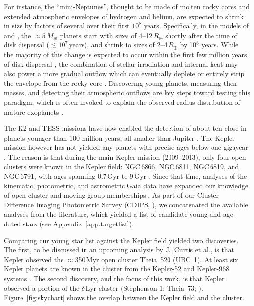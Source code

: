 \documentclass[12pt,modern,twocolumn,tighten]{aastex63}
\begin{document}
For instance, the ``mini-Neptunes'', thought to be made of molten
rocky cores \citep{kite_atmosphere_2020} and extended atmospheric
envelopes of hydrogen and helium, are expected to shrink in size by
factors of several over their first $10^8$ years.  Specifically, in
the models of \citet{owen_atmospheres_2016} and
\citet{owen_constraining_2020}, the $\approx5\,M_\oplus$ planets start
with sizes of 4--12\,$R_\oplus$ shortly after the time of disk
dispersal ($\lesssim$$10^7$\,years), and shrink to sizes of
2--4\,$R_\oplus$ by 10$^8$ years.  While the majority of this change
is expected to occur within the first few million years of disk
dispersal \citep{owen_atmospheres_2016}, the combination of stellar
irradiation and internal heat may also power a more gradual outflow
which can eventually deplete or entirely strip the envelope from the
rocky core \citep{Owen_Wu_2013,ginzburg_corepowered_2018}.
Discovering young planets, measuring their masses, and detecting their
atmospheric outflows are key steps toward testing this paradigm, which
is often invoked to explain the observed radius distribution of mature
exoplanets \citep{Fulton_et_al_2017}.

The K2 and TESS missions have now enabled the detection of about ten
close-in planets younger than 100 million years, all smaller than
Jupiter
\citep{Mann_K2_33b_2016,David_et_al_2017,david_four_2019,newton_tess_2019,bouma_cluster_2020,plavchan_planet_2020,rizzuto_tess_2020}.
The Kepler mission however has not yielded any planets with precise
ages below one gigayear \citep{Meibom_et_al_2013}.  The reason is that
during the main Kepler mission (2009--2013), only four open
clusters were known in the Kepler field: NGC\,6866, NGC\,6811,
NGC\,6819, and NGC\,6791, with ages spanning 0.7\,Gyr to 9\,Gyr
\citep{meibom_kepler_2011}.  Since that time, analyses of the
kinematic, photometric, and astrometric Gaia data have expanded our
knowledge of open cluster and moving group memberships \citep[{\it
e.g.},][]{cantatgaudin_gaia_2018,zari_3d_2018,kounkel_untangling_2019,Meingast2021,Kerr2021}.
As part of our Cluster Difference Imaging Photometric Survey (CDIPS,
\citealt{bouma_cdipsI_2019}), we concatenated the available analyses
from the literature, which yielded a list of candidate young and
age-dated stars (see Appendix~\ref{app:targetlist}).

Comparing our young star list against the Kepler field yielded two
discoveries.  The first, to be discussed in an upcoming analysis by
J.~Curtis et al{.}, is that Kepler observed the $\approx$350\,Myr open
cluster Theia~520 (UBC~1).  At least six Kepler planets are known in
the cluster from the Kepler-52 and Kepler-968 systems
\citep{rowe_validation_2014,jontof-hutter_following_2021}.  The second
discovery, and the focus of this work, is that Kepler observed a
portion of the $\delta$\,Lyr cluster (Stephenson-1; Theia~73;
\citealt{stephenson_possible_1959}).  Figure~\ref{fig:skychart} shows
the overlap between the Kepler field and the cluster.
\end{document}
